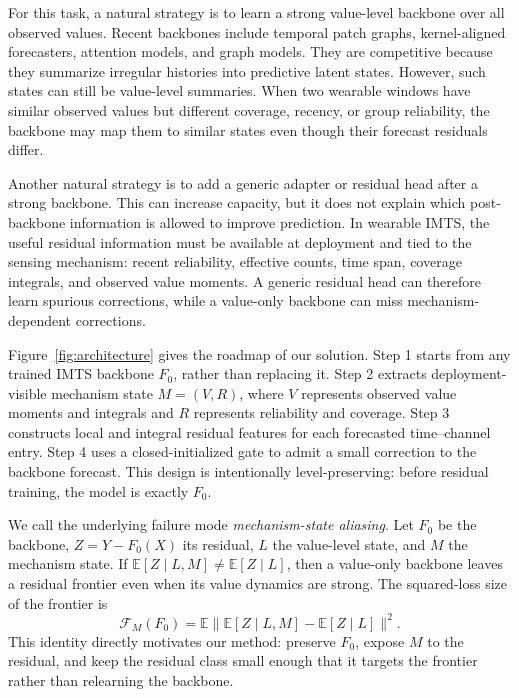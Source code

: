 ﻿\documentclass[10pt,conference]{IEEEtran}
\newcommand{\E}{\mathbb{E}}
\begin{document}
For this task, a natural strategy is to learn a strong value-level backbone
over all observed values.  Recent backbones include temporal patch graphs,
kernel-aligned forecasters, attention models, and graph models.  They are
competitive because they summarize irregular histories into predictive latent
states.  However, such states can still be value-level summaries.  When two
wearable windows have similar observed values but different coverage, recency,
or group reliability, the backbone may map them to similar states even though
their forecast residuals differ.

Another natural strategy is to add a generic adapter or residual head after a
strong backbone.  This can increase capacity, but it does not explain which
post-backbone information is allowed to improve prediction.  In wearable IMTS,
the useful residual information must be available at deployment and tied to the
sensing mechanism: recent reliability, effective counts, time span, coverage
integrals, and observed value moments.  A generic residual head can therefore
learn spurious corrections, while a value-only backbone can miss
mechanism-dependent corrections.

Figure~\ref{fig:architecture} gives the roadmap of our solution.  Step 1 starts
from any trained IMTS backbone \(F_0\), rather than replacing it.  Step 2
extracts deployment-visible mechanism state \(M=(V,R)\), where \(V\) represents
observed value moments and integrals and \(R\) represents reliability and
coverage.  Step 3 constructs local and integral residual features for each
forecasted time--channel entry.  Step 4 uses a closed-initialized gate to admit
a small correction to the backbone forecast.  This design is intentionally
level-preserving: before residual training, the model is exactly \(F_0\).

We call the underlying failure mode \emph{mechanism-state aliasing}.  Let
\(F_0\) be the backbone, \(Z=Y-F_0(X)\) its residual, \(L\) the value-level
state, and \(M\) the mechanism state.  If
\(\E[Z\mid L,M]\neq\E[Z\mid L]\), then a value-only backbone leaves a residual
frontier even when its value dynamics are strong.  The squared-loss size of the
frontier is
\begin{equation}
\mathcal{F}_M(F_0)=
\E\|\E[Z\mid L,M]-\E[Z\mid L]\|^2 .
\end{equation}
This identity directly motivates our method: preserve \(F_0\), expose \(M\) to
the residual, and keep the residual class small enough that it targets the
frontier rather than relearning the backbone.
\end{document}
